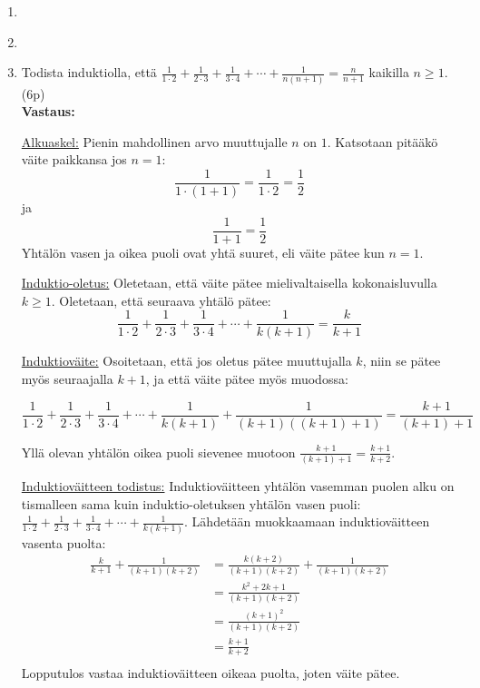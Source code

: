 \documentclass[a4paper,12pt]{article}
\begin{document}
 

\otsikko

\begin{enumerate}

\item 
    \begin{enumerate}
    \end{enumerate}
    
\item 
\begin{enumerate}
\end{enumerate}

\item Todista induktiolla, että $\frac{1}{1\cdot 2}+\frac{1}{2\cdot 3}+\frac{1}{3\cdot 4}+\cdots+\frac{1}{n(n+1)}=\frac{n}{n+1}$ kaikilla $n \geq 1$. (6p) \\

\textbf{Vastaus:}

\underline{Alkuaskel:} Pienin mahdollinen arvo muuttujalle $n$ on $1$. Katsotaan pitääkö väite paikkansa jos $n=1$:
\begin{equation*}
    \frac{1}{1\cdot(1+1)}=\frac{1}{1\cdot 2}=\frac{1}{2}
\end{equation*}
ja
\begin{equation*}
    \frac{1}{1+1}=\frac{1}{2}
\end{equation*}
Yhtälön vasen ja oikea puoli ovat yhtä suuret, eli väite pätee kun $n=1$. 

\underline{Induktio-oletus:} Oletetaan, että väite pätee mielivaltaisella kokonaisluvulla $k\geq1$. Oletetaan, että seuraava yhtälö pätee:
\begin{equation*}
    \frac{1}{1\cdot 2}+\frac{1}{2\cdot 3}+\frac{1}{3\cdot 4}+\cdots+\frac{1}{k(k+1)}=\frac{k}{k+1}
\end{equation*}

\underline{Induktioväite:} Osoitetaan, että jos oletus pätee muuttujalla $k$, niin se pätee myös seuraajalla $k+1$, ja että väite pätee myös muodossa:

\begin{equation*}
       \frac{1}{1\cdot 2}+\frac{1}{2\cdot 3}+\frac{1}{3\cdot 4}+\cdots+\frac{1}{k(k+1)}+\frac{1}{(k+1)((k+1)+1)}=\frac{k+1}{(k+1)+1}
\end{equation*}

Yllä olevan yhtälön oikea puoli sievenee  muotoon $\frac{k+1}{(k+1)+1}=\frac{k+1}{k+2}$.

\underline{Induktioväitteen todistus:} Induktioväitteen yhtälön vasemman puolen alku on tismalleen sama kuin induktio-oletuksen yhtälön vasen puoli: $\frac{1}{1\cdot 2}+\frac{1}{2\cdot 3}+\frac{1}{3\cdot 4}+\cdots+\frac{1}{k(k+1)}$. Lähdetään muokkaamaan induktioväitteen vasenta puolta:
\begin{align*}
    \frac{k}{k+1}+\frac{1}{(k+1)(k+2)}&=\frac{k(k+2)}{(k+1)(k+2)}+\frac{1}{(k+1)(k+2)}\\
    &=\frac{k^2+2k+1}{(k+1)(k+2)} \\
    &=\frac{(k+1)^2}{(k+1)(k+2)} \\
    &=\frac{k+1}{k+2} \\
\end{align*}
Lopputulos vastaa induktioväitteen oikeaa puolta, joten väite pätee.


\end{enumerate}
\end{document}
